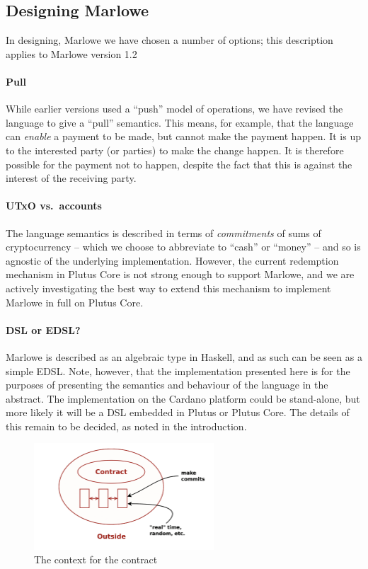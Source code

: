\documentclass[
      acmsmall
    , screen
    , review=true
  ]{acmart}
\begin{document}
\subsection{Designing Marlowe}

In designing, Marlowe we have chosen a number of options; this description applies to Marlowe version 1.2 

\paragraph{Pull} 

While earlier versions used a ``push'' model of operations, we have revised the language to give a ``pull'' semantics. 
This means, for example, that the language can \emph{enable} a payment to be made, but cannot make the payment happen. 
It is up to the interested party (or parties) to make the change happen. It is therefore possible for the payment not to 
happen, despite the fact that this is against the interest of the receiving party.


\paragraph{UTxO vs.\ accounts}

The language semantics is described in terms of \emph{commitments} of sums of cryptocurrency -- which we choose to 
abbreviate to ``cash'' or ``money'' -- and so is agnostic of the underlying implementation.  However, the current 
redemption mechanism in Plutus Core is not strong enough to support Marlowe, and we are actively investigating the best 
way to extend this mechanism to implement Marlowe in full on Plutus Core.

\paragraph{DSL or EDSL?}

Marlowe is described as an algebraic  type in Haskell, and as such can be seen as a simple EDSL. Note, however, that the implementation presented here is for the purposes of presenting the semantics and behaviour of the language in the abstract. The implementation on the Cardano platform could be stand-alone, but more likely it will be a DSL embedded in Plutus or Plutus Core. The details of this remain to be decided, as noted in the introduction.

\begin{figure}[t]
\begin{center}
\includegraphics[width=0.6\textwidth]{pix/context.png}
\caption{The context for the contract}
\label{fig:context}
\end{center}
\end{figure}
\end{document}
